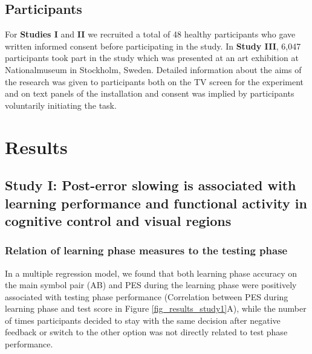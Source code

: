 \documentclass[12pt,openany]{book}
\theoremstyle{definition}
\theoremstyle{definition}
\theoremstyle{definition}
\theoremstyle{remark}
\begin{document}
\section{Participants}\label{participants}

For \textbf{Studies I} and \textbf{II} we recruited a total of 48
healthy participants who gave written informed consent before
participating in the study. In \textbf{Study III}, 6,047 participants
took part in the study which was presented at an art exhibition at
Nationalmuseum in Stockholm, Sweden. Detailed information about the aims
of the research was given to participants both on the TV screen for the
experiment and on text panels of the installation and consent was
implied by participants voluntarily initiating the task.

\chapter{Results}\label{results}

\section{Study I: Post-error slowing is associated with learning
performance and functional activity in cognitive control and visual
regions}\label{study-i-post-error-slowing-is-associated-with-learning-performance-and-functional-activity-in-cognitive-control-and-visual-regions}

\subsection{Relation of learning phase measures to the testing
phase}\label{relation-of-learning-phase-measures-to-the-testing-phase}

In a multiple regression model, we found that both learning phase
accuracy on the main symbol pair (AB) and PES during the learning phase
were positively associated with testing phase performance (Correlation
between PES during learning phase and test score in Figure
\ref{fig_results_study1}A), while the number of times participants
decided to stay with the same decision after negative feedback or switch
to the other option was not directly related to test phase performance.
\end{document}
